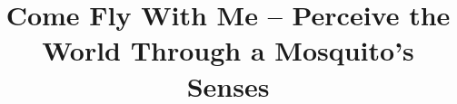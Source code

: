 \documentclass{sig-alternate-05-2015}
\begin{document}


%
%
%

%

\title{Come Fly With Me -- Perceive the World Through a Mosquito's Senses}
%
%
%
%
%
\end{document}
